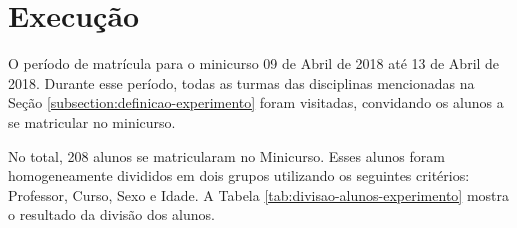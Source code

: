 \section{Execução}\label{section:execucao-experimento}

O período de matrícula para o minicurso 09 de Abril de 2018 até 13 de Abril de 2018. Durante esse período, todas as turmas
das disciplinas mencionadas na Seção \ref{subsection:definicao-experimento} foram visitadas, convidando os alunos a se matricular no minicurso.

No total, 208 alunos se matricularam no Minicurso. Esses alunos foram homogeneamente divididos em dois grupos utilizando os
seguintes critérios: Professor, Curso, Sexo e Idade. A Tabela \ref{tab:divisao-alunos-experimento} mostra o resultado da divisão dos alunos.

